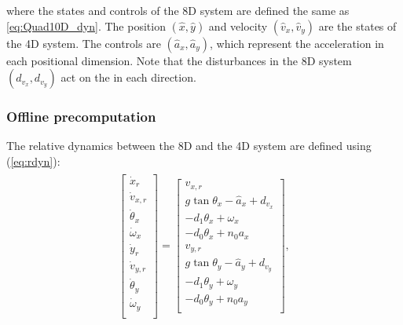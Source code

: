 where the states and controls of the 8D system are defined the same as \eqref{eq:Quad10D_dyn}. The position $(\hat x,\hat y)$ and velocity $(\hat v_x, \hat v_y)$ are the states of the 4D system. The controls are $(\hat a_x, \hat a_y)$, which represent the acceleration in each positional dimension. Note that the disturbances in the 8D system $(d_{v_x},d_{v_y})$ act on the  in each direction. 

\subsubsection{Offline precomputation}

The relative dynamics between the 8D and the 4D system are defined using (\ref{eq:rdyn}):
%
%
\begin{equation}
\label{eq:Quad8DRel_dyn}
\begin{aligned}
\begin{array}{c}
\left[
\begin{array}{c}
\dot x_r\\
\dot v_{x,r}\\
\dot \theta_x\\
\dot \omega_x\\
\dot y_r\\
\dot v_{y,r}\\
\dot \theta_y\\
\dot \omega_y\\
\end{array}
\right]
=
\left[
\begin{array}{c}
v_{x,r}\\
g \tan \theta_x - \hat a_x + d_{v_x}\\
-d_1 \theta_x + \omega_x\\
-d_0 \theta_x + n_0 a_x\\
v_{y,r}\\
g \tan \theta_y - \hat a_y + d_{v_y}\\
-d_1 \theta_y + \omega_y\\
-d_0 \theta_y + n_0 a_y\\
\end{array}
\right],
\end{array}\\
\end{aligned}
\end{equation}
